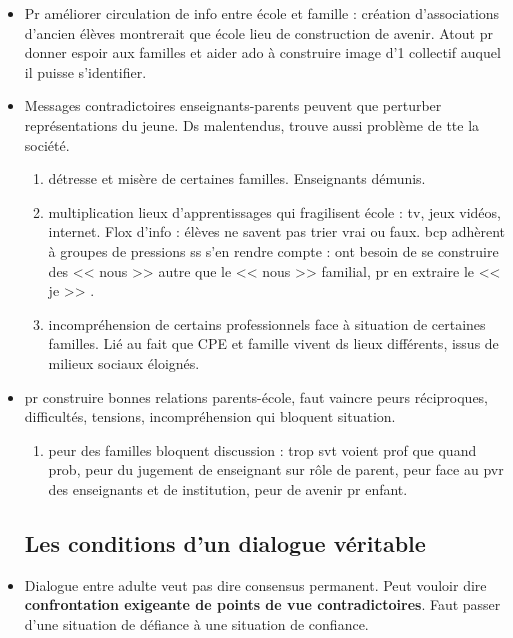 \documentclass[12pt]{report}
\begin{document}
\begin{itemize}
\begin{itemize}
\vspace{0.5cm}

\item Pr améliorer circulation de info entre école et famille : création d'associations d'ancien élèves montrerait que école lieu de construction de avenir. Atout pr donner espoir aux familles et aider ado à construire image d'1 collectif auquel il puisse s'identifier.\\

\item Messages contradictoires enseignants-parents peuvent que perturber représentations du jeune. Ds malentendus, trouve aussi problème de tte la société.
\begin{enumerate}
\item détresse et misère de certaines familles. Enseignants démunis.\\
\item multiplication lieux d'apprentissages qui fragilisent école : tv, jeux vidéos, internet. Flox d'info : élèves ne savent pas trier vrai ou faux. bcp adhèrent à groupes de pressions ss s'en rendre compte : ont besoin de se construire des << nous >> autre que le << nous >> familial, pr en extraire le << je >> . \\
\item incompréhension de certains professionnels face à situation de certaines familles. Lié au fait que CPE et famille vivent ds lieux différents, issus de milieux sociaux éloignés.\\
\end{enumerate}

\item pr construire bonnes relations parents-école, faut vaincre peurs réciproques, difficultés, tensions, incompréhension qui bloquent situation.
\begin{enumerate}
\item peur des familles bloquent discussion : trop svt voient prof que quand prob, peur du jugement de enseignant sur rôle de parent, peur face au pvr des enseignants et de institution, peur de avenir pr enfant.\\
\end{enumerate}

\subsection{Les conditions d'un dialogue véritable}


\item Dialogue entre adulte veut pas dire consensus permanent. Peut vouloir dire \textbf{confrontation exigeante de points de vue contradictoires}. Faut passer d'une situation de défiance à une situation de confiance.


\end{itemize}
\end{itemize}
\end{document}
